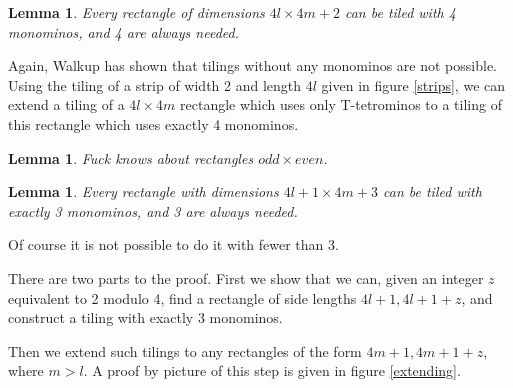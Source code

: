 \documentclass{article}
\theoremstyle{plain}
\newtheorem{lemma}[theorem]{Lemma}
\begin{document}
\begin{lemma}
Every rectangle of dimensions $4l \times 4m + 2$ can be tiled with 4 monominos, and 4 are always needed.
\end{lemma}
Again, Walkup has shown that tilings without any monominos are not possible. Using the tiling of a strip of width 2 and length $4l$ given in figure \ref{strips}, we can extend a tiling of a $4l \times 4m$ rectangle which uses only T-tetrominos to a tiling of this rectangle which uses exactly 4 monominos.

\begin{lemma}
Fuck knows about rectangles $odd \times even$.
\end{lemma}

\begin{lemma}
Every rectangle with dimensions $4l + 1 \times 4m + 3$ can be tiled with exactly 3 monominos, and 3 are always needed.
\end{lemma}
Of course it is not possible to do it with fewer than 3.

There are two parts to the proof. First we show that we can, given an integer $z$ equivalent to 2 modulo 4, find a rectangle of side lengths $4l + 1, 4l + 1 + z$, and construct a tiling with exactly 3 monominos. 

Then we extend such tilings to any rectangles of the form $4m + 1, 4m + 1 + z$, where $m > l$. A proof by picture of this step is given in figure \ref{extending}.


{}

\end{document}
